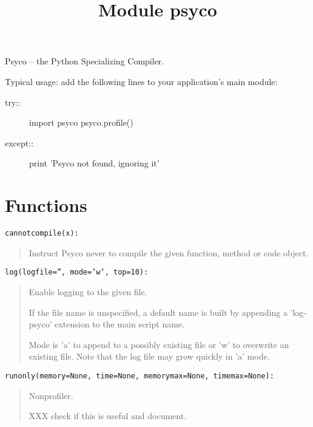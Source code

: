 \documentclass[10pt,english]{article}
\title{Module psyco}
\author{}
\date{}
\begin{document}
\maketitle


Psyco -- the Python Specializing Compiler.

Typical usage: add the following lines to your application's main module:
\begin{description}
\item[try::]

import psyco
psyco.profile()

\item[except::]

print 'Psyco not found, ignoring it'

\end{description}



\hypertarget{functions}{}
\section*{Functions}

\texttt{cannotcompile(x):}
\begin{quote}

Instruct Psyco never to compile the given function, method
or code object.
\end{quote}

\texttt{log(logfile='', mode='w', top=10):}
\begin{quote}

Enable logging to the given file.

If the file name is unspecified, a default name is built by appending
a 'log-psyco' extension to the main script name.

Mode is 'a' to append to a possibly existing file or 'w' to overwrite
an existing file. Note that the log file may grow quickly in 'a' mode.
\end{quote}

\texttt{runonly(memory=None, time=None, memorymax=None, timemax=None):}
\begin{quote}

Nonprofiler.

XXX check if this is useful and document.
\end{quote}
\end{document}
